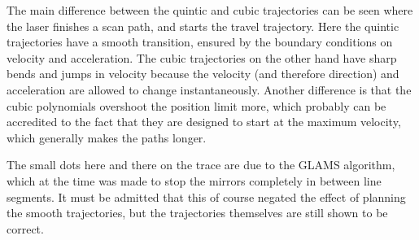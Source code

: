 The main difference between the quintic and cubic trajectories can be seen where the laser finishes a scan path, and starts the travel trajectory. Here the quintic trajectories have a smooth transition, ensured by the boundary conditions on velocity and acceleration. The cubic trajectories on the other hand have sharp bends and jumps in velocity because the velocity (and therefore direction) and acceleration are allowed to change instantaneously. Another difference is that the cubic polynomials overshoot the position limit more, which probably can be accredited to the fact that they are designed to start at the maximum velocity, which generally makes the paths longer.

The small dots here and there on the trace are due to the GLAMS algorithm, which at the time was made to stop the mirrors completely in between line segments. It must be admitted that this of course negated the effect of planning the smooth trajectories, but the trajectories themselves are still shown to be correct.